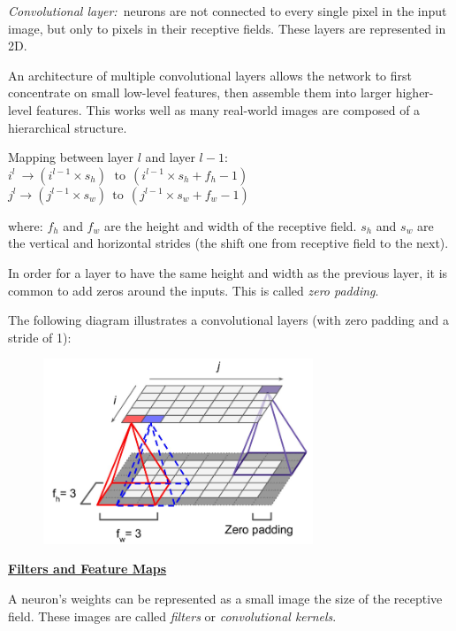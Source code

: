 \textit{Convolutional layer:}~neurons are not connected to every single pixel in the input image,
but only to pixels in their receptive fields. These layers are represented in 2D.

An architecture of multiple convolutional layers allows the network to first concentrate on small low-level features,
then assemble them into larger higher-level features.
This works well as many real-world images are composed of a hierarchical structure.

Mapping between layer $l$ and layer $l-1$:\newline
$i^{l} ~\rightarrow (i^{l-1} \times s_h)~~\,\textrm{to}~~(i^{l-1} \times s_h + f_h -1)$\newline
$j^{l} \rightarrow (j^{l-1} \times s_w)~~\textrm{to}~~(j^{l-1} \times s_w + f_w -1)$

where:\newline
$f_h$ and $f_w$ are the height and width of the receptive field.\newline
$s_h$ and $s_w$ are the vertical and horizontal strides (the shift one from receptive field to the next).

In order for a layer to have the same height and width as the previous layer,
it is common to add zeros around the inputs. This is called \textit{zero padding}.

The following diagram illustrates a convolutional layers (with zero padding and a stride of 1):

\begin{figure}[ht]
\centering
\includegraphics[width=0.72\textwidth]{./images/conv_layer.png}
\end{figure}

\newpage

\textbf{\underline{Filters and Feature Maps}}

A neuron's weights can be represented as a small image the size of the receptive field.\newline
These images are called \textit{filters} or \textit{convolutional kernels}.

